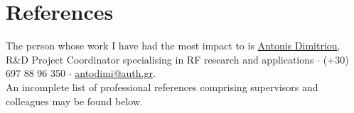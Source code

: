 \documentclass[a4paper,10pt,twoside]{article}
\begin{document}


\par{\bigskip\par}



\section{References}
\vspace{1em}

\noindent The person whose work I have had the most impact to is \href{https://gr.linkedin.com/in/antonis-dimitriou-21003452}{Antonis Dimitriou}, R\&D Project Coordinator specialising in RF research and applications $\cdot$ (+30) 697 88 96 350 $\cdot$ \href{mailto:antodimi@auth.gr}{antodimi@auth.gr}. \\

\noindent An incomplete list of professional references comprising supervisors and colleagues may be found below.
\vspace{1em}

\end{document}

